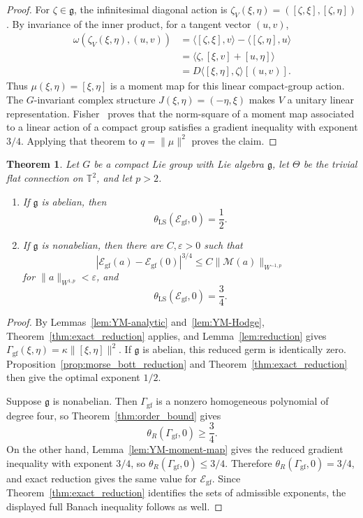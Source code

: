 \documentclass[11pt]{article}
\newtheorem{theorem}{Theorem}[section]
\theoremstyle{definition}
\theoremstyle{remark}
\begin{document}
\begin{proof}
For $\zeta\in\mathfrak g$, the infinitesimal diagonal action is
$\zeta_V(\xi,\eta)=([\zeta,\xi],[\zeta,\eta])$. By invariance of the inner product, for a tangent vector $(u,v)$,
\begin{align*}
\omega(\zeta_V(\xi,\eta),(u,v))
&=\langle[\zeta,\xi],v\rangle-\langle[\zeta,\eta],u\rangle\\
&=\langle\zeta,[\xi,v]+[u,\eta]\rangle\\
&=D\langle[\xi,\eta],\zeta\rangle[(u,v)].
\end{align*}
Thus $\mu(\xi,\eta)=[\xi,\eta]$ is a moment map for this linear compact-group action. The $G$-invariant complex structure $J(\xi,\eta)=(-\eta,\xi)$ makes $V$ a unitary linear representation. Fisher~\cite[Theorem~4.7]{Fisher2014} proves that the norm-square of a moment map associated to a linear action of a compact group satisfies a gradient inequality with exponent $3/4$. Applying that theorem to $q=\|\mu\|^2$ proves the claim.
\end{proof}

\begin{theorem}\label{thm:YM-gauge-fixed}
Let $G$ be a compact Lie group with Lie algebra $\mathfrak g$, let $\Theta$ be the trivial flat connection on $\mathbb T^2$, and let $p>2$.
\begin{enumerate}
\item If $\mathfrak g$ is abelian, then
$$
\theta_{\mathrm{LS}}(\mathcal E_{\mathrm{gf}},0)=\frac12.
$$
\item If $\mathfrak g$ is nonabelian, then there are $C,\varepsilon>0$ such that
$$
|\mathcal E_{\mathrm{gf}}(a)-\mathcal E_{\mathrm{gf}}(0)|^{3/4}
\le C\|\mathcal M(a)\|_{W^{-1,p}}
$$
for $\|a\|_{W^{1,p}}<\varepsilon$, and
$$
\theta_{\mathrm{LS}}(\mathcal E_{\mathrm{gf}},0)=\frac34.
$$
\end{enumerate}
\end{theorem}

\begin{proof}
By Lemmas~\ref{lem:YM-analytic} and~\ref{lem:YM-Hodge}, Theorem~\ref{thm:exact_reduction} applies, and Lemma~\ref{lem:reduction} gives $\Gamma_{\mathrm{gf}}(\xi,\eta)=\kappa\|[\xi,\eta]\|^2$.
If $\mathfrak g$ is abelian, this reduced germ is identically zero. Proposition~\ref{prop:morse_bott_reduction} and Theorem~\ref{thm:exact_reduction} then give the optimal exponent $1/2$.

Suppose $\mathfrak g$ is nonabelian. Then $\Gamma_{\mathrm{gf}}$ is a nonzero homogeneous polynomial of degree four, so Theorem~\ref{thm:order_bound} gives
$$
\theta_R(\Gamma_{\mathrm{gf}},0)\ge\frac34.
$$
On the other hand, Lemma~\ref{lem:YM-moment-map} gives the reduced gradient inequality with exponent $3/4$, so
$\theta_R(\Gamma_{\mathrm{gf}},0)\le3/4$. Therefore
$\theta_R(\Gamma_{\mathrm{gf}},0)=3/4$, and exact reduction gives the same value for $\mathcal E_{\mathrm{gf}}$. Since Theorem~\ref{thm:exact_reduction} identifies the sets of admissible exponents, the displayed full Banach inequality follows as well.
\end{proof}
\end{document}
